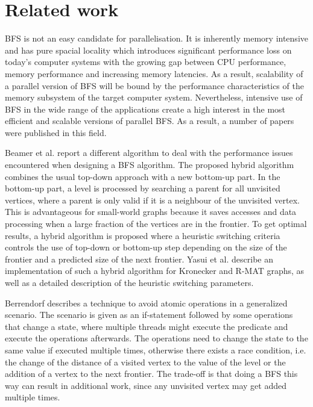 \documentclass[letterpaper]{article}
\begin{document}
	\section{Related work} \label{sec:rewo} %
		BFS is not an easy candidate for parallelisation.
		It is inherently memory intensive and has pure spacial locality which introduces significant performance loss on today's computer systems with the growing gap between CPU performance, memory performance and increasing memory latencies.
		As a result, scalability of a parallel version of BFS will be bound by the performance characteristics of the memory subsystem of the target computer system. 
		Nevertheless, intensive use of BFS in the wide range of the applications create a high interest in the most efficient and scalable versions of parallel BFS.
		As a result, a number of papers were published in this field. 
		
		Beamer et al.\cite{beamer2011searching} report a different algorithm to deal with the performance issues encountered when designing a BFS algorithm. 
		The proposed hybrid algorithm combines the usual top-down approach with a new bottom-up part. 
		In the bottom-up part, a level is processed by searching a parent for all unvisited vertices, where a parent is only valid if it is a neighbour of the unvisited vertex. 
		This is advantageous for small-world graphs because it saves accesses and data processing when a large fraction of the vertices are in the frontier. 
		To get optimal results, a hybrid algorithm is proposed where a heuristic switching criteria controls the use of top-down or bottom-up step depending on the size of the frontier and a predicted size of the next frontier. 
		Yasui et al.\cite{6691600} describe an implementation of such a hybrid algorithm for Kronecker and R-MAT graphs, as well as a detailed description of the heuristic switching parameters.
	
		Berrendorf\cite{Berrendorf:14} describes a technique to avoid atomic operations in a generalized scenario. 
		The scenario is given as an if-statement followed by some operations that change a state, where multiple threads might execute the predicate and execute the operations afterwards. 
		The operations need to change the state to the same value if executed multiple times, otherwise there exists a race condition, i.e. the change of the distance of a visited vertex to the value of the level or the addition of a vertex to the next frontier. 
		The trade-off is that doing a BFS this way can result in additional work, since any unvisited vertex may get added multiple times.
		
\end{document}
